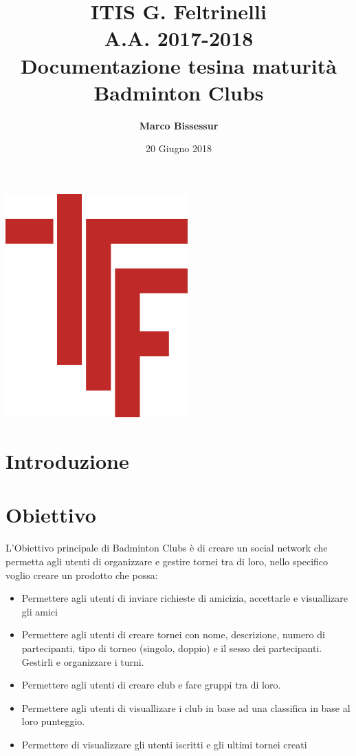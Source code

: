 \documentclass{article}
\author{\textbf{Marco Bissessur}}
\date{20 Giugno 2018}
\title{ITIS G. Feltrinelli
        \\A.A. 2017\@-\@2018
        \\Documentazione tesina maturità \\ \textbf{Badminton Clubs}
      }
\begin{document}
    \maketitle
    \begin{center}
        \includegraphics[width=7cm]{logofeltrinelli}
    \end{center}
    \clearpage
    {\hypersetup{hidelinks}\tableofcontents}
    \clearpage
    
    \section{Introduzione}

    \section{Obiettivo}
L'Obiettivo principale di Badminton Clubs è di creare un social network che permetta   agli utenti di organizzare e gestire tornei tra di loro, nello specifico voglio creare un prodotto che possa:
\begin{itemize}
    \item Permettere agli utenti di inviare richieste di amicizia, accettarle e visuallizare gli amici
    \item Permettere agli utenti di creare tornei con nome, descrizione, numero di partecipanti, tipo di torneo (singolo, doppio) e il sesso dei partecipanti. Gestirli e organizzare i turni.
    \item Permettere agli utenti di creare club e fare gruppi tra di loro.
    \item Permettere agli utenti  di visuallizare i club in base ad una classifica in base al loro punteggio.
    \item Permettere di visualizzare gli utenti iscritti e gli ultimi tornei creati
\end{itemize}
\end{document}
